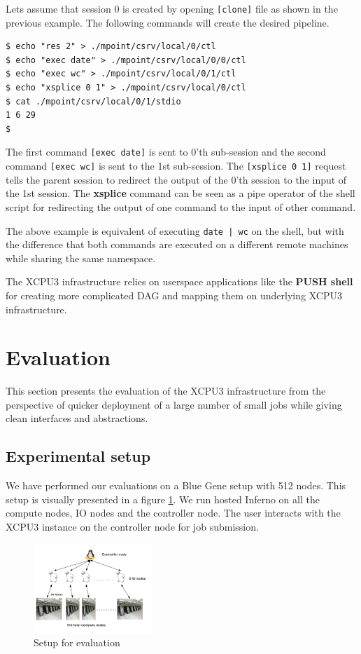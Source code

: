 \documentclass[conference]{IEEEtran}
\begin{document}
Lets assume that session 0 is created by opening \texttt{[clone]} file as shown
in the previous example.  The following commands will create the desired
pipeline.

\begin{verbatim}
$ echo "res 2" > ./mpoint/csrv/local/0/ctl
$ echo "exec date" > ./mpoint/csrv/local/0/0/ctl
$ echo "exec wc" > ./mpoint/csrv/local/0/1/ctl
$ echo "xsplice 0 1" > ./mpoint/csrv/local/0/ctl
$ cat ./mpoint/csrv/local/0/1/stdio
1 6 29
$
\end{verbatim}

The first command \texttt{[exec date]} is sent to 0'th sub-session and the
second command \texttt{[exec wc]} is sent to the 1st sub-session.  The
\texttt{[xsplice 0 1]} request tells the parent session to redirect the output
of the 0'th session to the input of the 1st session.  The \textbf{xsplice}
command can be seen as a pipe operator of the shell script for redirecting the
output of one command to the input of other command.

The above example is equivalent of executing \texttt{date | wc} on the shell,
but with the difference that both commands are executed on a different remote
machines while sharing the same namespace.

The XCPU3 infrastructure relies on userspace applications like the \textbf{PUSH
shell}\cite{PODC:Push} for creating more complicated DAG and mapping them on
underlying XCPU3 infrastructure.

\section{Evaluation}

This section presents the evaluation of the XCPU3 infrastructure from the
perspective of quicker deployment of a large number of small jobs while giving
clean interfaces and abstractions.


\subsection{Experimental setup}
We have performed our evaluations on a Blue Gene setup with 512 nodes.  This
setup is visually presented in a figure \ref{fig:hare}.  We run hosted Inferno
on all the compute nodes, IO nodes and the controller node.  The user interacts 
with the XCPU3 instance on the controller node for job submission.


\begin{figure}[h]
  \begin{center}
    \leavevmode
      \includegraphics[height=0.2\textheight,width=0.4\textwidth]
		{./img/EvaluationSetup}
    \caption{Setup for evaluation}
    \label{fig:hare}
  \end{center}
\end{figure}
\end{document}
